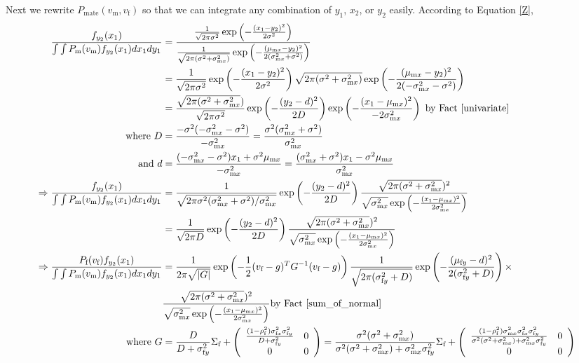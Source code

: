 \documentclass{article}
\newcommand{\x}[1]{\text{#1}}
\begin{document}
Next we rewrite $P_\text{mate}(v_\x{m},v_\x{f})$ so that we can integrate any combination of $y_1$, $x_2$, or $y_2$ easily. According to Equation \ref{Z}, 
\begin{align*}
\frac{f_{y_2}(x_1)}{\int\int P_\x{m}(v_\x{m})f_{y_2}(x_1)dx_1dy_1}&=\frac{\frac{1}{\sqrt{2\pi\sigma^2}}\exp\left(-\frac{(x_1-y_2)^2}{2\sigma^2}\right)}{\frac{1}{\sqrt{2\pi(\sigma^2+\sigma_{\x{m}x}^2)}}\exp\left(-\frac{(\mu_{\x{m}x}-y_2)^2}{2(\sigma_{\x{m}x}^2+\sigma^2)}\right)}
\\&=\frac{1}{\sqrt{2\pi\sigma^2}}\exp\left(-\frac{(x_1-y_2)^2}{2\sigma^2}\right)\sqrt{2\pi(\sigma^2+\sigma_{\x{m}x}^2)}\exp\left(-\frac{(\mu_{\x{m}x}-y_2)^2}{2(-\sigma_{\x{m}x}^2-\sigma^2)}\right)
\\&=\frac{\sqrt{2\pi(\sigma^2+\sigma_{\x{m}x}^2})}{\sqrt{2\pi\sigma^2}}\exp\left(-\frac{(y_2-d)^2}{2D}\right)\exp\left(-\frac{(x_1-\mu_{\x{m}x})^2}{-2\sigma_{\x{m}x}^2}\right)\text{ by Fact \ref{univariate}}
\\ \text{ where } D&=\frac{-\sigma^2(-\sigma_{\x{m}x}^2-\sigma^2)}{-\sigma_{\x{m}x}^2}=\frac{\sigma^2(\sigma_{\x{m}x}^2+\sigma^2)}{\sigma_{\x{m}x}^2} 
\\\text{ and } d&=\frac{(-\sigma_{\x{m}x}^2-\sigma^2)x_1+\sigma^2\mu_{\x{m}x}}{-\sigma_{\x{m}x}^2}=\frac{(\sigma_{\x{m}x}^2+\sigma^2)x_1-\sigma^2\mu_{\x{m}x}}{\sigma_{\x{m}x}^2}
\\ \Rightarrow \frac{f_{y_2}(x_1)}{\int\int P_\x{m}(v_\x{m})f_{y_2}(x_1)dx_1dy_1}&=\frac{1}{\sqrt{2\pi \sigma^2(\sigma_{\x{m}x}^2+\sigma^2)/\sigma_{\x{m}x}^2}}\exp\left(-\frac{(y_2-d)^2}{2D}\right)\frac{\sqrt{2\pi(\sigma^2+\sigma_{\x{m}x}^2})^2}{\sqrt{\sigma_{\x{m}x}^2}\exp\left(-\frac{(x_1-\mu_{\x{m}x})^2}{2\sigma_{\x{m}x}^2}\right)}
\\&=\frac{1}{\sqrt{2\pi D}}\exp\left(-\frac{(y_2-d)^2}{2D}\right)\frac{\sqrt{2\pi(\sigma^2+\sigma_{\x{m}x}^2})^2}{\sqrt{\sigma_{\x{m}x}^2}\exp\left(-\frac{(x_1-\mu_{\x{m}x})^2}{2\sigma_{\x{m}x}^2}\right)}
\\\Rightarrow \frac{P_\x{f}(v_\x{f})f_{y_2}(x_1)}{\int\int P_\x{m}(v_\x{m})f_{y_2}(x_1)dx_1dy_1}&=\frac{1}{2\pi\sqrt{|G|}}\exp\left(-\frac{1}{2}(v_\x{f}-g)^TG^{-1}(v_\x{f}-g)\right)\frac{1}{\sqrt{2\pi(\sigma_{\x{f}y}^2+D)}}\exp\left(-\frac{(\mu_{\x{f}y}-d)^2}{2(\sigma_{\x{f}y}^2+D)}\right)\times
\\&\frac{\sqrt{2\pi(\sigma^2+\sigma_{\x{m}x}^2})^2}{\sqrt{\sigma_{\x{m}x}^2}\exp\left(-\frac{(x_1-\mu_{\x{m}x})^2}{2\sigma_{\x{m}x}^2}\right)} \text{by Fact \ref{sum_of_normal}}
\\ \text{ where } G &= \frac{D}{D+\sigma_{\x{f}y}^2}\Sigma_\x{f}+\left(\begin{array}{cc} \frac{(1-\rho_\x{f}^2)\sigma_{\x{f}x}^2\sigma_{\x{f}y}^2}{D+\sigma_{\x{f}y}^2} & 0  \\ 0 & 0 \end{array}\right) = \frac{\sigma^2(\sigma^2+\sigma_{\x{m}x}^2)}{\sigma^2(\sigma^2+\sigma_{\x{m}x}^2)+\sigma_{\x{m}x}^2\sigma_{\x{f}y}^2}\Sigma_\x{f}+\left(\begin{array}{cc} \frac{(1-\rho_\x{f}^2)\sigma_{\x{m}x}^2\sigma_{\x{f}x}^2\sigma_{\x{f}y}^2}{\sigma^2(\sigma^2+\sigma_{\x{m}x}^2)+\sigma_{\x{m}x}^2\sigma_{\x{f}y}^2} & 0  \\ 0 & 0 \end{array}\right)

\end{align*}
\end{document}
